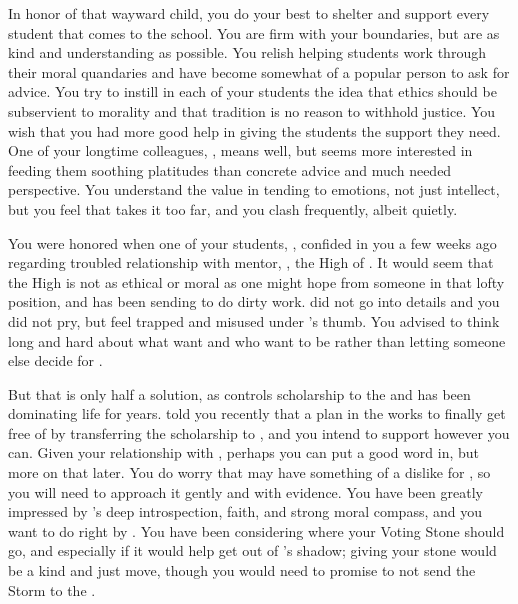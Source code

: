 \documentclass[char]{GL2020}
\begin{document}
In honor of that wayward child, you do your best to shelter and support every student that comes to the school. You are firm with your boundaries, but are as kind and understanding as possible. You relish helping students work through their moral quandaries and have become somewhat of a popular person to ask for advice. You try to instill in each of your students the idea that ethics should be subservient to morality and that tradition is no reason to withhold justice. You wish that you had more good help in giving the students the support they need. One of your longtime colleagues, \cMusic{\full}, means well, but seems more interested in feeding them soothing platitudes than concrete advice and much needed perspective. You understand the value in tending to emotions, not just intellect, but you feel that \cMusic{} takes it too far, and you clash frequently, albeit quietly.

You were honored when one of your students, \cScholarship{\full}, confided in you a few weeks ago regarding \cScholarship{\their} troubled relationship with \cScholarship{\their} mentor, \cAntiChup{\full}, the High \cAntiChup{\Cleric} of \cTechGod{}. It would seem that the High \cAntiChup{\Cleric} is not as ethical or moral as one might hope from someone in that lofty position, and has been sending \cScholarship{} to do \cAntiChup{\their} dirty work. \cScholarship{} did not go into details and you did not pry, but \cScholarship{\they} feel\cScholarship{\verbs} trapped and misused under \cAntiChup{}’s thumb. You advised \cScholarship{} to think long and hard about what \emph{\cScholarship{\they}} want\cScholarship{\verbs} and who \emph{\cScholarship{\they}} want\cScholarship{\verbs} to be rather than letting someone else decide for \cScholarship{\them}. 

But that is only half a solution, as \cAntiChup{} controls \cScholarship{\their} scholarship to the \pSchool{} and has been dominating \cScholarship{\their} life for years. \cScholarship{} told you recently that \cScholarship{\theyhave} a plan in the works to finally get free of \cAntiChup{} by transferring the scholarship to \cBeetle{\full}, and you intend to support \cScholarship{\them} however you can. Given your relationship with \cBeetle{}, perhaps you can put a good word in, but more on that later. You do worry that \cBeetle{} may have something of a dislike for \cScholarship{}, so you will need to approach it gently and with evidence. You have been greatly impressed by \cScholarship{}’s deep introspection, faith, and strong moral compass, and you want to do right by \cScholarship{\them}. You have been considering where your Voting Stone should go, and especially if it would help \cScholarship{\them} get out of \cAntiChup{}’s shadow; giving \cScholarship{\them} your stone would be a kind and just move, though you would need \cScholarship{} to promise to not send the Storm to the \pShip{}.
\end{document}
